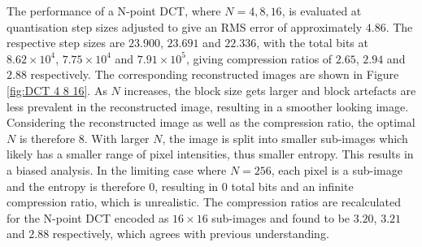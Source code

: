 The performance of a N-point DCT, where $N = 4, 8, 16$, is evaluated at quantisation step sizes adjusted to give an RMS error of approximately $4.86$. The respective step sizes are $23.900$, $23.691$ and $22.336$, with the total bits at $8.62 \times 10^4$, $7.75 \times 10^4$ and $7.91 \times 10^5$, giving compression ratios of $2.65$, $2.94$ and $2.88$ respectively. The corresponding reconstructed images are shown in Figure \ref{fig:DCT 4 8 16}. As $N$ increases, the block size gets larger and block artefacts are less prevalent in the reconstructed image, resulting in a smoother looking image. Considering the reconstructed image as well as the compression ratio, the optimal $N$ is therefore 8. With larger $N$, the image is split into smaller sub-images which likely has a smaller range of pixel intensities, thus smaller entropy. This results in a biased analysis. In the limiting case where $N=256$, each pixel is a sub-image and the entropy is therefore 0, resulting in 0 total bits and an infinite compression ratio, which is unrealistic. The compression ratios are recalculated for the N-point DCT encoded as $16 \times 16$ sub-images and found to be $3.20$, $3.21$ and $2.88$ respectively, which agrees with previous understanding.
